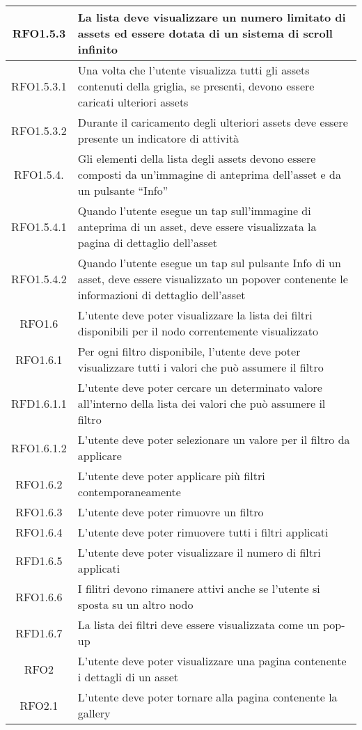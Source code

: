 \begin{longtable}{|c|m{10cm}|}
RFO1.5.3 & La lista deve visualizzare un numero limitato di assets ed essere dotata di un sistema di scroll infinito \\ \hline
RFO1.5.3.1 & Una volta che l'utente visualizza tutti gli assets contenuti della griglia, se presenti, devono essere caricati ulteriori assets \\ \hline
RFO1.5.3.2 & Durante il caricamento degli ulteriori assets deve essere presente un indicatore di attività \\ \hline
RFO1.5.4. & Gli elementi della lista degli assets devono essere composti da un'immagine di anteprima dell'asset e da un pulsante ``Info'' \\ \hline
RFO1.5.4.1 & Quando l'utente esegue un tap sull'immagine di anteprima di un asset, deve essere visualizzata la pagina di dettaglio dell'asset \\ \hline
RFO1.5.4.2 & Quando l'utente esegue un tap sul pulsante Info di un asset, deve essere visualizzato un popover contenente le informazioni di dettaglio dell'asset \\ \hline
RFO1.6 & L'utente deve poter visualizzare la lista dei filtri disponibili per il nodo correntemente visualizzato \\ \hline
RFO1.6.1 & Per ogni filtro disponibile, l'utente deve poter visualizzare tutti i valori che può assumere il filtro \\ \hline
RFD1.6.1.1 & L'utente deve poter cercare un determinato valore all'interno della lista dei valori che può assumere il filtro \\ \hline
RFO1.6.1.2 & L'utente deve poter selezionare un valore per il filtro da applicare \\ \hline
RFO1.6.2 & L'utente deve poter applicare più filtri contemporaneamente \\ \hline
RFO1.6.3 & L'utente deve poter rimuovre un filtro \\ \hline
RFO1.6.4 & L'utente deve poter rimuovere tutti i filtri applicati \\ \hline
RFD1.6.5 & L'utente deve poter visualizzare il numero di filtri applicati \\ \hline
RFO1.6.6 & I filitri devono rimanere attivi anche se l'utente si sposta su un altro nodo \\ \hline
RFD1.6.7 & La lista dei filtri deve essere visualizzata come un pop-up \\ \hline
RFO2 & L'utente deve poter visualizzare una pagina contenente i dettagli di un asset \\ \hline
RFO2.1 & L'utente deve poter tornare alla pagina contenente la gallery \\ \hline

\end{longtable}
